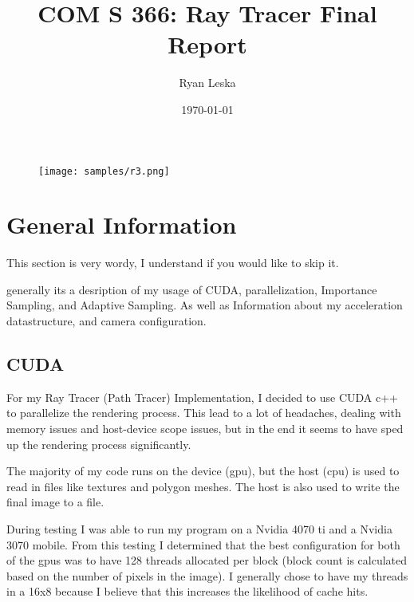 \documentclass{article}
\title{COM S 366: Ray Tracer Final Report}
\author{Ryan Leska}
\date{\today}
\begin{document}
\maketitle


\begin{figure}[h!]
    \centering
    \texttt{[image: samples/r3.png]}
\end{figure}

\pagebreak

\twocolumn


\tableofcontents



\section{General Information}

    This section is very wordy, I understand if you would like to skip it. \par
    generally its a desription of my usage of CUDA, parallelization, Importance Sampling, and Adaptive Sampling. As well as Information about my acceleration datastructure, and camera configuration. \par

    \subsection{CUDA}
    For my Ray Tracer (Path Tracer) Implementation, I decided to use CUDA c++ to parallelize the rendering process. This lead to a lot of headaches, dealing with memory issues and host-device scope issues, but in the end it seems to have sped up the rendering process significantly. \par

    The majority of my code runs on the device (gpu), but the host (cpu) is used to read in files like  textures and polygon meshes. The host is also used to write the final image to a file. \par  

    During testing I was able to run my program on a Nvidia 4070 ti and a Nvidia 3070 mobile. From this testing I determined that the best configuration for both of the gpus was to have 128 threads allocated per block (block count is calculated based on the number of pixels in the image). I generally chose to have my threads in a 16x8 because I believe that this increases the likelihood of cache hits. \par
\end{document}
